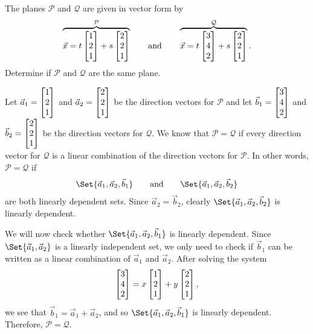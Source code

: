 \begin{example}
	The planes $\mathcal P$ and $\mathcal Q$ are given in vector form by
	\[
		\overbrace{\vec x=t\mat{1\\2\\1}+s\mat{2\\2\\1}}^{\mathcal P}
		\qquad\text{and}\qquad
		\overbrace{\vec x=t\mat{3\\4\\2}+s\mat{2\\2\\1}}^{\mathcal Q}.
	\]
	Determine if $\mathcal P$ and $\mathcal Q$ are the same plane.

	Let $\vec a_1=\mat{1\\2\\1}$ and $\vec a_2=\mat{2\\2\\1}$ be the direction vectors
	for $\mathcal P$ and let
	$\vec b_1=\mat{3\\4\\2}$ and $\vec b_2=\mat{2\\2\\1}$ be the direction vectors
	for $\mathcal Q$. We know that $\mathcal P=\mathcal Q$ if every direction vector for $\mathcal Q$
	is a linear combination of the direction vectors for $\mathcal P$. In other words, 
	$\mathcal P=\mathcal Q$ if
	\[
		\Set{\vec a_1,\vec a_2,\vec b_1}\qquad\text{and}\qquad \Set{\vec a_1,\vec a_2,\vec b_2}
	\]
	are both linearly dependent sets. Since $\vec a_2=\vec b_2$, clearly $\Set{\vec a_1,\vec a_2,\vec b_2}$
	is linearly dependent. 

	We will now check whether $\Set{\vec a_1,\vec a_2,\vec b_1}$ is linearly dependent. Since $\Set{\vec a_1,\vec a_2}$
	is a linearly independent set, we only need to check if $\vec b_1$ can be written as a linear combination of $\vec a_1$ and $\vec a_2$.
	After solving the system
	\[
		\mat{3\\4\\2}=x\mat{1\\2\\1}+y\mat{2\\2\\1},
	\]
	we see that $\vec b_1=\vec a_1+\vec a_2$, and so $\Set{\vec a_1,\vec a_2,\vec b_1}$ is linearly dependent. Therefore,
	$\mathcal P=\mathcal Q$.
\end{example}

